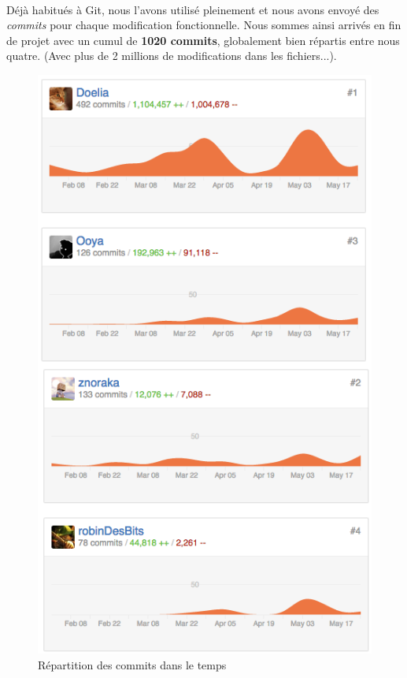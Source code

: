 \paragraph{}
Déjà habitués à Git, nous l'avons utilisé pleinement et nous avons envoyé des \emph{commits} pour chaque modification fonctionnelle. Nous sommes ainsi arrivés en fin de projet avec un cumul de \textbf{1020 commits}, globalement bien répartis entre nous quatre. (Avec plus de 2 millions de modifications dans les fichiers...).
 
\begin{figure}[H]\centering
  \includegraphics[scale=.5]{./img/github_commits.png}
  \caption{Répartition des commits dans le temps}
  \label{github_commits}
\end{figure}
 
